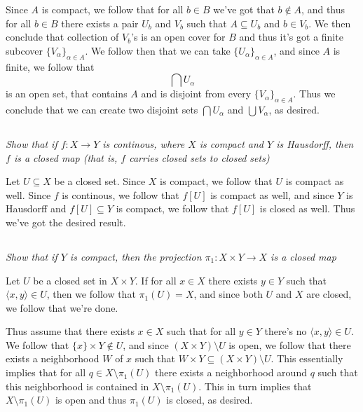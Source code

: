 \documentclass[11pt,oneside,titlepage]{book}
\newcommand{\eangle}[1]{\langle #1 \rangle}
\newcommand{\set}[1]{\{ #1 \}}
\begin{document}
Since $A$ is compact, we follow that for all $b \in B$ we've got that $b \notin A$, and thus
for all $b \in B$ there exists a pair $U_b$ and $V_b$ such that $A \subseteq U_b$
and $b \in V_b$. We then conclude that collection of $V_b$'s is an open cover for $B$
and thus it's got a finite subcover $\set{V_\alpha}_{\alpha \in A}$. We follow then that
we can take $\set{U_\alpha}_{\alpha \in A}$, and since $A$ is finite, we follow that
$$\bigcap{U_\alpha}$$
is an open set, that contains $A$ and is disjoint from every $\set{V_\alpha}_{\alpha \in A}$.
Thus we conclude that we can create two disjoint sets
$\bigcap{U_\alpha}$ and $\bigcup{V_\alpha}$, as desired.

\subsection{}

\textit{Show that if $f: X \to Y$ is continous, where $X$ is compact and $Y$ is
  Hausdorff, then $f$ is a closed map (that is, $f$ carries closed sets to closed sets)}

Let $U \subseteq X$ be a closed set. Since $X$ is compact, we follow that $U$ is compact as well.
Since $f$ is continous, we follow that $f[U]$ is compact as well, and since $Y$ is Hausdorff
and $f[U] \subseteq Y$ is compact, we follow that $f[U]$ is closed as well. Thus we've got the
desired result.

\subsection{}

\textit{Show that if $Y$ is compact, then the projection $\pi_1: X \times Y \to X$ is a
  closed map}

Let $U$ be a closed set in $X \times Y$.
If for all $x \in X$ there exists $y \in Y$ such that  $\eangle{x, y} \in U$, then we follow that
$\pi_1(U) = X$, and since both $U$ and $X$ are closed, we follow that we're done.

Thus assume that there exists $x \in X$ such that for all $y \in Y$ there's no $\eangle{x, y} \in U$.
We follow that $\set{x} \times Y \notin U$, and since $(X \times Y) \setminus U$ is open, we follow
that there exists a neighborhood $W$ of $x$ such that
$W \times Y \subseteq (X \times Y) \setminus U$. This essentially implies that
for all $q \in X \setminus \pi_1(U)$ there exists a neighborhood around $q$ such that
this neighborhood is contained in $X \setminus \pi_1(U)$. This in turn implies that
$X \setminus \pi_1(U)$ is open and thus $\pi_1(U)$ is closed, as desired.
\end{document}
